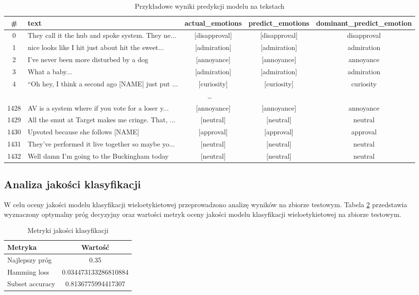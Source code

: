 \documentclass[wmii, inf, mgr]{uwmthesis}
\begin{document}
\begin{table}[H]
	\centering
	\scriptsize
	\renewcommand{\arraystretch}{1.4}
	\begin{tabularx}{\textwidth}{|c|X|c|c|c|}
		\hline
		\textbf{\#} & \textbf{text} & \textbf{actual\_emotions} & \textbf{predict\_emotions} & \textbf{dominant\_predict\_emotion} \\ \hline
		0 & They call it the hub and spoke system. They ne... & [disapproval] & [disapproval] & disapproval \\ \hline
		1 & nice looks like I hit just about hit the sweet... & [admiration] & [admiration] & admiration \\ \hline
		2 & I've never been more disturbed by a dog & [annoyance] & [annoyance] & annoyance \\ \hline
		3 & What a baby... & [admiration] & [admiration] & admiration \\ \hline
		4 & “Oh hey, I think a second ago [NAME] just put ... & [curiosity] & [curiosity] & curiosity \\ \hline
		\multicolumn{5}{|c|}{\dots} \\ \hline
		1428 & AV is a system where if you vote for a loser y... & [annoyance] & [annoyance] & annoyance \\ \hline
		1429 & All the smut at Target makes me cringe. That, ... & [neutral] & [neutral] & neutral \\ \hline
		1430 & Upvoted because she follows [NAME] & [approval] & [approval] & approval \\ \hline
		1431 & They’ve performed it live together so maybe yo... & [neutral] & [neutral] & neutral \\ \hline
		1432 & Well damn I’m going to the Buckingham today & [neutral] & [neutral] & neutral \\ \hline
	\end{tabularx}
	\caption{Przykładowe wyniki predykcji modelu na tekstach}
	\label{tab:predykcje}
\end{table}


\subsection{Analiza jakości klasyfikacji}
W celu oceny jakości modelu klasyfikacji wieloetykietowej przeprowadzono analizę wyników na zbiorze testowym. Tabela \ref{tab:metryki} przedstawia wyznaczony optymalny próg decyzyjny oraz wartości metryk oceny jakości modelu klasyfikacji wieloetykietowej na zbiorze testowym.
\begin{table}[H]
	\centering
	\renewcommand{\arraystretch}{1.6}
	\begin{tabular}{|l|c|}
		\hline
		\textbf{Metryka} & \textbf{Wartość} \\ \hline
		Najlepszy próg & 0.35 \\ \hline
		Hamming loss & 0.034473133286810884 \\ \hline
		Subset accuracy & 0.8136775994417307 \\ \hline
	\end{tabular}
	\caption{Metryki jakości klasyfikacji}
	\label{tab:metryki}
\end{table}
 
\end{document}
